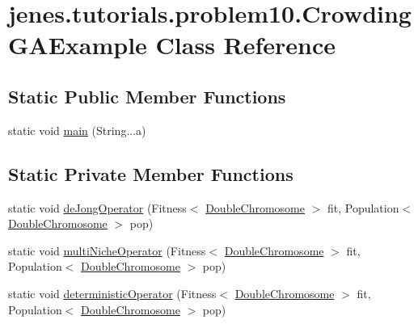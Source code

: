 \hypertarget{classjenes_1_1tutorials_1_1problem10_1_1_crowding_g_a_example}{\section{jenes.\-tutorials.\-problem10.\-Crowding\-G\-A\-Example Class Reference}
\label{classjenes_1_1tutorials_1_1problem10_1_1_crowding_g_a_example}
}
\subsection*{Static Public Member Functions}
\begin{DoxyCompactItemize}
\item 
static void \hyperlink{classjenes_1_1tutorials_1_1problem10_1_1_crowding_g_a_example_a847763f724496b95a266a6fe2b54c3d7}{main} (String...\-a)
\end{DoxyCompactItemize}
\subsection*{Static Private Member Functions}
\begin{DoxyCompactItemize}
\item 
static void \hyperlink{classjenes_1_1tutorials_1_1problem10_1_1_crowding_g_a_example_a6424dacb3ce72723ed89e8eea24cbbbe}{de\-Jong\-Operator} (Fitness$<$ \hyperlink{classjenes_1_1chromosome_1_1_double_chromosome}{Double\-Chromosome} $>$ fit, Population$<$ \hyperlink{classjenes_1_1chromosome_1_1_double_chromosome}{Double\-Chromosome} $>$ pop)
\item 
static void \hyperlink{classjenes_1_1tutorials_1_1problem10_1_1_crowding_g_a_example_ab1e91aaf830444e9c1fd42ba6f902a21}{multi\-Niche\-Operator} (Fitness$<$ \hyperlink{classjenes_1_1chromosome_1_1_double_chromosome}{Double\-Chromosome} $>$ fit, Population$<$ \hyperlink{classjenes_1_1chromosome_1_1_double_chromosome}{Double\-Chromosome} $>$ pop)
\item 
static void \hyperlink{classjenes_1_1tutorials_1_1problem10_1_1_crowding_g_a_example_aa588b8d616f543e4a5c942f6af867a51}{deterministic\-Operator} (Fitness$<$ \hyperlink{classjenes_1_1chromosome_1_1_double_chromosome}{Double\-Chromosome} $>$ fit, Population$<$ \hyperlink{classjenes_1_1chromosome_1_1_double_chromosome}{Double\-Chromosome} $>$ pop)
\end{DoxyCompactItemize}
